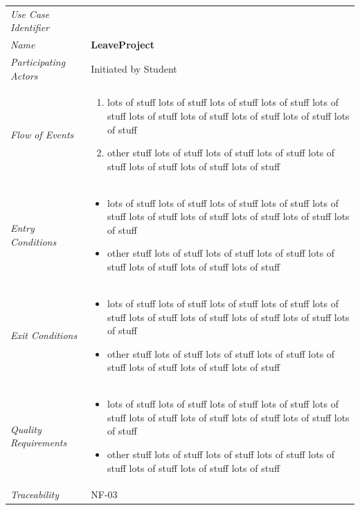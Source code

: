 \documentclass[12pt,letterpaper]{article}
\begin{document}
\begin{center}
	\begin{tabu} to 
		\toprule
		Use Case Identifier & \leaveproject{} \\
		Name & {\bf LeaveProject} \\
		Participating Actors & Initiated by Student \\
		Flow of Events & 
	    \begin{enumerate}[topsep=-1em]
		    \item lots of stuff lots of stuff lots of stuff lots of stuff lots of stuff lots of stuff lots of stuff lots of stuff lots of stuff lots of stuff
		    \item other stuff lots of stuff lots of stuff lots of stuff lots of stuff lots of stuff lots of stuff lots of stuff
		\end{enumerate} \\

		Entry Conditions &
		\begin{itemize}[topsep=-1em]
		    \item lots of stuff lots of stuff lots of stuff lots of stuff lots of stuff lots of stuff lots of stuff lots of stuff lots of stuff lots of stuff
		    \item other stuff lots of stuff lots of stuff lots of stuff lots of stuff lots of stuff lots of stuff lots of stuff
        \end{itemize} \\

		Exit Conditions &
		\begin{itemize}[topsep=-1em]
		    \item lots of stuff lots of stuff lots of stuff lots of stuff lots of stuff lots of stuff lots of stuff lots of stuff lots of stuff lots of stuff
		    \item other stuff lots of stuff lots of stuff lots of stuff lots of stuff lots of stuff lots of stuff lots of stuff
        \end{itemize} \\

		Quality Requirements &
		\begin{itemize}[topsep=-1em]
		    \item lots of stuff lots of stuff lots of stuff lots of stuff lots of stuff lots of stuff lots of stuff lots of stuff lots of stuff lots of stuff
		    \item other stuff lots of stuff lots of stuff lots of stuff lots of stuff lots of stuff lots of stuff lots of stuff
        \end{itemize} \\

		Traceability & NF-03 \\
		\toprule
	\end{tabu}
\end{center}
\end{document}
